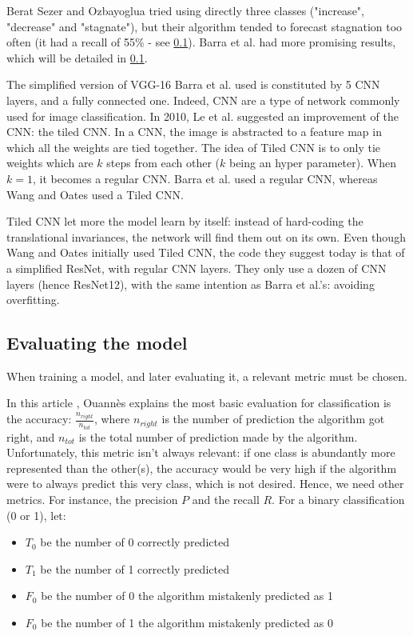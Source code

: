 \documentclass[11pt]{article}
\begin{document}
\begin{onehalfspace}
Berat Sezer and Ozbayoglua \cite{berat} tried using directly three classes ("increase", "decrease" and "stagnate"), but their algorithm tended to forecast stagnation too often (it had a recall of 55\% - see \ref{sec:LR_eval}). Barra et al. \cite{barra} had more promising results, which will be detailed in \ref{sec:LR_eval}.

The simplified version of VGG-16 Barra et al. used is constituted by 5 CNN layers, and a fully connected one. Indeed, CNN are a type of network commonly used for image classification. In 2010, Le et al. \cite{le} suggested an improvement of the CNN: the tiled CNN. In a CNN, the image is abstracted to a feature map in which all the weights are tied together. The idea of Tiled CNN is to only tie weights which are $k$ steps from each other ($k$ being an hyper parameter). When $k = 1$, it becomes a regular CNN. Barra et al. used a regular CNN, whereas Wang and Oates \cite{wang} used a Tiled CNN.

Tiled CNN let more the model learn by itself: instead of hard-coding the translational invariances, the network will find them out on its own. Even though Wang and Oates initially used Tiled CNN, the code they suggest today is that of a simplified ResNet, with regular CNN layers. They only use a dozen of CNN layers (hence ResNet12), with the same intention as Barra et al.'s: avoiding overfitting. 

\subsection{Evaluating the model}
\label{sec:LR_eval}

When training a model, and later evaluating it, a relevant metric must be chosen. 

In this article \cite{ouannes}, Ouannès explains the most basic evaluation for classification is the accuracy: $\frac{n_{right}}{n_{tot}}$, where $n_{right}$ is the number of prediction the algorithm got right, and $n_{tot}$ is the total number of prediction made by the algorithm. Unfortunately, this metric isn't always relevant: if one class is abundantly more represented than the other(s), the accuracy would be very high if the algorithm were to always predict this very class, which is not desired. Hence, we need other metrics. For instance, the precision $P$ and the recall $R$. For a binary classification (0 or 1), let:

\begin{itemize}
    \item $T_0$ be the number of 0 correctly predicted
    \item $T_1$ be the number of 1 correctly predicted
    \item $F_0$ be the number of 0 the algorithm mistakenly predicted as 1
    \item $F_0$ be the number of 1 the algorithm mistakenly predicted as 0
\end{itemize}


\end{onehalfspace}
\end{document}
